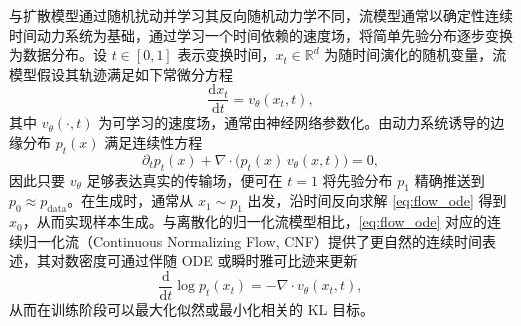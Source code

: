 与扩散模型通过随机扰动并学习其反向随机动力学不同，流模型通常以确定性连续时间动力系统为基础，通过学习一个时间依赖的速度场，将简单先验分布逐步变换为数据分布。设 $t\in[0,1]$ 表示变换时间，$x_t\in\mathbb{R}^d$ 为随时间演化的随机变量，流模型假设其轨迹满足如下常微分方程
\begin{equation}\label{eq:flow_ode}
\frac{\mathrm{d}x_t}{\mathrm{d}t} = v_\theta(x_t,t),
\end{equation}
其中 $v_\theta(\cdot,t)$ 为可学习的速度场，通常由神经网络参数化。由动力系统诱导的边缘分布 $p_t(x)$ 满足连续性方程
\begin{equation}\label{eq:continuity_eq}
\partial_t p_t(x) + \nabla\!\cdot\!\bigl(p_t(x)\,v_\theta(x,t)\bigr)=0,
\end{equation}
因此只要 $v_\theta$ 足够表达真实的传输场，便可在 $t=1$ 将先验分布 $p_1$ 精确推送到 $p_0\approx p_{\mathrm{data}}$。在生成时，通常从 $x_1\sim p_1$ 出发，沿时间反向求解 \cref{eq:flow_ode} 得到 $x_0$，从而实现样本生成。与离散化的归一化流模型相比，\cref{eq:flow_ode} 对应的连续归一化流（Continuous Normalizing Flow, CNF）提供了更自然的连续时间表述，其对数密度可通过伴随 ODE 或瞬时雅可比迹来更新
\begin{equation}\label{eq:cnf_logp}
\frac{\mathrm{d}}{\mathrm{d}t}\log p_t(x_t) = - \nabla\!\cdot v_\theta(x_t,t),
\end{equation}
从而在训练阶段可以最大化似然或最小化相关的 KL 目标。




